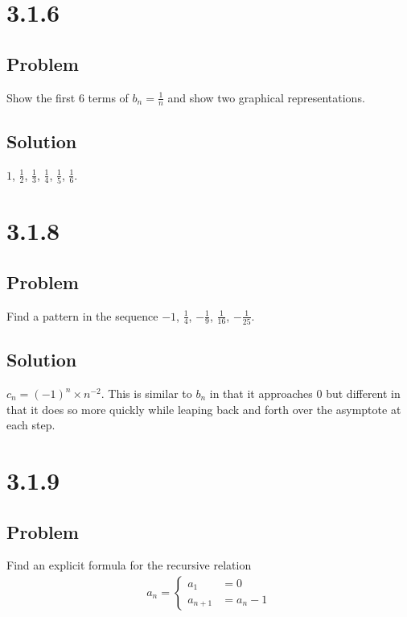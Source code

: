 \documentclass[12pt]{article}
\begin{document}
\section*{3.1.6}

\subsection*{Problem}

Show the first 6 terms of $b_n = \frac{1}{n}$ and show two graphical representations.

\subsection*{Solution}

$1$, $\frac{1}{2}$, $\frac{1}{3}$, $\frac{1}{4}$, $\frac{1}{5}$, $\frac{1}{6}$.



\section*{3.1.8}

\subsection*{Problem}

Find a pattern in the sequence $-1$, $\frac{1}{4}$, $-\frac{1}{9}$, $\frac{1}{16}$, $-\frac{1}{25}$.

\subsection*{Solution}

$c_n = (-1)^n \times n^{-2}$. This is similar to $b_n$ in that it approaches 0 but different in that it does so more quickly while leaping back and forth over the asymptote at each step.



\section*{3.1.9}

\subsection*{Problem}

Find an explicit formula for the recursive relation
\begin{align*}
    a_n = \begin{cases}
        a_1 &= 0 \\
        a_{n + 1} &= a_n - 1
    \end{cases}
\end{align*}
\end{document}
